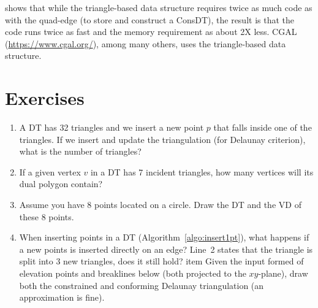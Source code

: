
\citet{Shewchuk97} shows that while the triangle-based data structure requires twice as much code as with the quad-edge (to store and construct a ConsDT), the result is that the code runs twice as fast and the memory requirement as about 2X less.
CGAL (\url{https://www.cgal.org/}), among many others, uses the triangle-based data structure.


%
\section{Exercises}

\begin{enumerate}
  \item A DT has 32 triangles and we insert a new point $p$ that falls inside one of the triangles. If we insert and update the triangulation (for Delaunay criterion), what is the number of triangles?
  \item If a given vertex $v$ in a DT has 7 incident triangles, how many vertices will its dual polygon contain?
  \item Assume you have 8 points located on a circle. Draw the DT and the VD of these 8 points.
  \item When inserting points in a DT (Algorithm~\ref{algo:insert1pt}), what happens if a new points is inserted directly on an edge? Line~2 states that the triangle is split into 3 new triangles, does it still hold?
  item Given the input formed of elevation points and breaklines below (both projected to the $xy$-plane), draw both the constrained and conforming Delaunay triangulation (an approximation is fine).
  \\ \\
  \begin{figure}[h]
  \centering
  \begin{subfigure}[b]{0.4\linewidth}

\end{subfigure}
\end{figure}
\end{enumerate}
